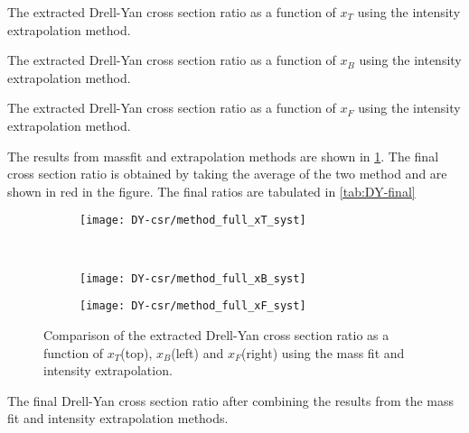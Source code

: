 \documentclass[../main.tex]{subfiles}
\begin{document}
\begin{table}[h!]
	\centering
	\caption{The extracted Drell-Yan cross section ratio as a function of $x_T$ using the intensity extrapolation method.}
	\label{tab:DY-IE-x2}
	
\end{table}
\begin{table}[h!]
	\centering
	\caption{The extracted Drell-Yan cross section ratio as a function of $x_B$ using the intensity extrapolation method.}
	\label{tab:DY-IE-x1}
	
\end{table}
\begin{table}[h!]
	\centering
	\caption{The extracted Drell-Yan cross section ratio as a function of $x_F$ using the intensity extrapolation method.}
	\label{tab:DY-IE-xF}
	
\end{table}
\FloatBarrier

The results from massfit and extrapolation methods are shown in \cref{fig:CSR_method}. The final cross section ratio
is obtained by taking the average of the two method and are shown in red in the figure. The final ratios are tabulated
in \cref{tab:DY-final} 
\begin{figure}[h!]
	\centering
	\begin{subfigure}{0.6\linewidth}
		\texttt{[image: DY-csr/method\_full\_xT\_syst]}
	\end{subfigure}\\
	\begin{subfigure}{0.45\linewidth}
		\texttt{[image: DY-csr/method\_full\_xB\_syst]}
	\end{subfigure}
	\begin{subfigure}{0.45\linewidth}
		\texttt{[image: DY-csr/method\_full\_xF\_syst]}
	\end{subfigure}
	\caption{Comparison of the extracted Drell-Yan cross section ratio as a function of $x_T$(top),
		$x_B$(left) and $x_F$(right) using the mass fit and intensity extrapolation.}
	\label{fig:CSR_method}
\end{figure}

\begin{table}[h!]
	\centering
	\caption{The final Drell-Yan cross section ratio after combining the results from the mass fit and intensity extrapolation methods.}
	\label{tab:DY-final}
	\scalebox{0.925}{
		
	}
\end{table}

\FloatBarrier

\ifSubfilesClassLoaded{ \printbibliography[heading=bibintoc,title={References}]}{}
\end{document}
